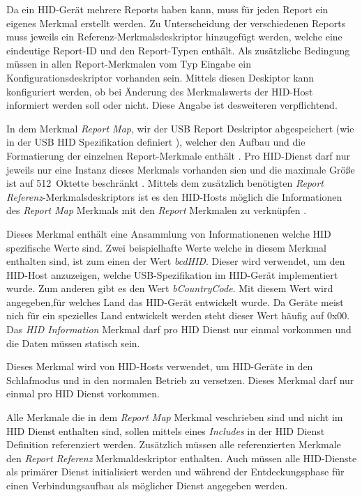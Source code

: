 Da ein \acs{HID}-Gerät mehrere Reports haben kann, muss für jeden Report ein eigenes Merkmal erstellt werden. Zu Unterscheidung der verschiedenen Reports muss jeweils ein Referenz-Merkmalsdeskriptor hinzugefügt werden, welche eine eindeutige Report-ID und den Report-Typen enthält. Als zusätzliche Bedingung müssen in allen Report-Merkmalen vom Typ Eingabe ein Konfigurationsdeskriptor vorhanden sein. Mittels diesen Deskiptor kann konfiguriert werden, ob bei Änderung des Merkmalswerts der \acs{HID}-Host informiert werden soll oder nicht. Diese Angabe ist desweiteren verpflichtend. \cite[S.~14.f]{bluetoothHIDS}

In dem Merkmal \textit{Report Map}, wir der USB Report Deskriptor abgespeichert (wie in der USB \acs{HID} Spezifikation definiert \cite[S.~21]{bluetoothHOGP}), welcher den Aufbau und die Formatierung der einzelnen Report-Merkmale enthält \cite[S.~11]{bluetoothHIDS}. Pro \acs{HID}-Dienst darf nur jeweils nur eine Instanz dieses Merkmals vorhanden sien und die maximale Größe ist auf 512~Oktette beschränkt \cite[S.~16]{bluetoothHIDS}. Mittels dem zusätzlich benötigten \textit{Report Referenz}-Merkmalsdeskriptors ist es den \acs{HID}-Hosts möglich die Informationen des \textit{Report Map} Merkmals mit den \textit{Report} Merkmalen zu verknüpfen \cite[S.~17]{bluetoothHIDS}.

Dieses Merkmal enthält eine Ansammlung von Informationenen welche \acs{HID} spezifische Werte sind. Zwei beispielhafte Werte welche in diesem Merkmal enthalten sind, ist zum einen der Wert \textit{bcdHID}. Dieser wird verwendet, um den \acs{HID}-Host anzuzeigen, welche USB-Spezifikation im \acs{HID}-Gerät implementiert wurde. Zum anderen gibt es den Wert \textit{bCountryCode}. Mit diesem Wert wird angegeben,für welches Land das \acs{HID}-Gerät entwickelt wurde. Da Geräte meist nich für ein spezielles Land entwickelt werden steht dieser Wert häufig auf 0x00. Das \textit{\acs{HID} Information} Merkmal darf pro \acs{HID} Dienst nur einmal vorkommen und die Daten müssen statisch sein. \cite[S.~20f.]{bluetoothHIDS}

Dieses Merkmal wird von \acs{HID}-Hosts verwendet, um \acs{HID}-Geräte in den Schlafmodus und in den normalen Betrieb zu versetzen. Dieses Merkmal darf nur einmal pro \acs{HID} Dienst vorkommen. \cites[S.~23]{bluetoothHOGP}[S.~21]{bluetoothHIDS}

Alle Merkmale die in dem \textit{Report Map} Merkmal veschrieben sind und nicht im \acs{HID} Dienst enthalten sind, sollen mittels eines \textit{Includes} in der \acs{HID} Dienst Definition referenziert werden. Zusätzlich müssen alle referenzierten Merkmale den \textit{Report Referenz} Merkmaldeskriptor enthalten. Auch müssen alle \acs{HID}-Dienste als primärer Dienst initialisiert werden und während der Entdeckungsphase für einen Verbindungsaufbau als möglicher Dienst angegeben werden. \cite[S.~13f.]{bluetoothHOGP}

